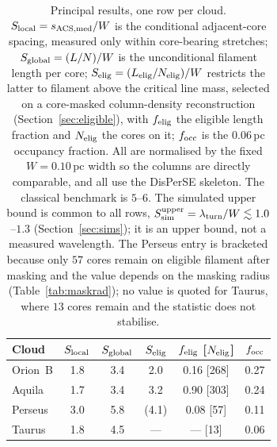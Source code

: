 \documentclass[usenatbib,twoside,twocolumn]{mnras}
\begin{document}
\begin{table}
\caption{Principal results, one row per cloud. $S_{\rm local}=s_{\rm ACS,med}/W$ is the conditional adjacent-core spacing, measured only within core-bearing stretches; $S_{\rm global}=(L/N)/W$ is the unconditional filament length per core; $S_{\rm elig}=(L_{\rm elig}/N_{\rm elig})/W$ restricts the latter to filament above the critical line mass, selected on a core-masked column-density reconstruction (Section~\ref{sec:eligible}), with $f_{\rm elig}$ the eligible length fraction and $N_{\rm elig}$ the cores on it; $f_{\rm occ}$ is the $0.06$\,pc occupancy fraction. All are normalised by the fixed $W=0.10$\,pc width so the columns are directly comparable, and all use the DisPerSE skeleton. The classical benchmark is $5$--$6$. The simulated upper bound is common to all rows, $S_{\rm sim}^{\rm upper}=\lambda_{\rm turn}/W\lesssim1.0$--$1.3$ (Section~\ref{sec:sims}); it is an upper bound, not a measured wavelength. The Perseus entry is bracketed because only $57$ cores remain on eligible filament after masking and the value depends on the masking radius (Table~\ref{tab:maskrad}); no value is quoted for Taurus, where $13$ cores remain and the statistic does not stabilise.}
\label{tab:principal}
\footnotesize
\setlength{\tabcolsep}{4pt}
\begin{tabular}{lccccc}
\toprule
Cloud & $S_{\rm local}$ & $S_{\rm global}$ & $S_{\rm elig}$ & $f_{\rm elig}$ [$N_{\rm elig}$] & $f_{\rm occ}$ \\
\midrule
Orion~B & 1.8 & 3.4 & 2.0    & 0.16 [268] & 0.27 \\
Aquila  & 1.7 & 3.4 & 3.2    & 0.90 [303] & 0.24 \\
Perseus & 3.0 & 5.8 & (4.1)  & 0.08 [57]  & 0.11 \\
Taurus  & 1.8 & 4.5 & ---    & --- [13]   & 0.06 \\
\bottomrule
\end{tabular}
\end{table}
\end{document}
